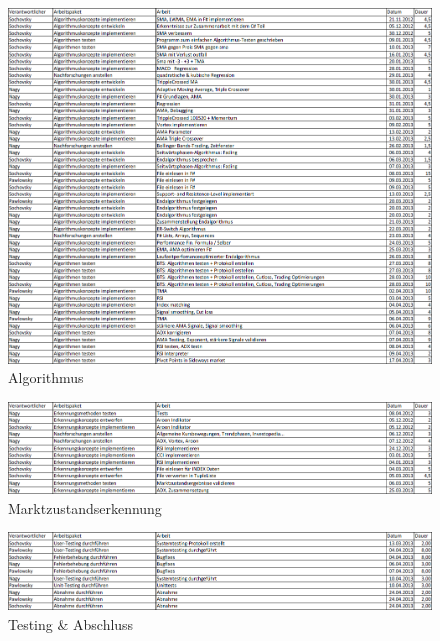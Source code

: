 \begin{figure}
	\centering
		\includegraphics[width=1.2\textwidth, angle=90]{graphics/appendix/algorithmus.PNG}
	\caption*{Algorithmus}
\end{figure}

\begin{figure}
	\centering
		\includegraphics[width=1.2\textwidth, angle=90]{graphics/appendix/marktzustandserkennung.PNG}
	\caption*{Marktzustandserkennung}
\end{figure}

\begin{figure}
	\centering
		\includegraphics[width=1.2\textwidth, angle=90]{graphics/appendix/testingabschluss.PNG}
	\caption*{Testing \& Abschluss}
\end{figure}

